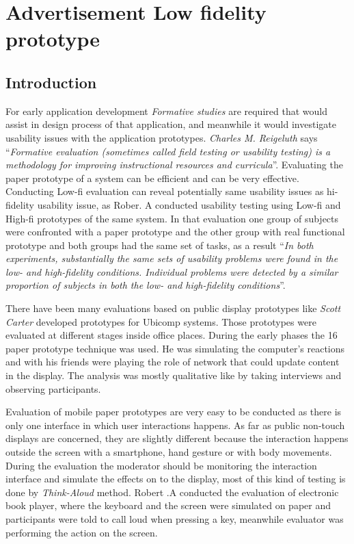\chapter{Advertisement Low fidelity prototype} %

\label{Chapter5} %
\newpage


\section{Introduction}
For early application development \emph{Formative studies} are required that would assist in design process of that application, and meanwhile it would investigate usability issues with the application prototypes. \emph{Charles M. Reigeluth} \cite{formativestudy} says ``\emph{Formative evaluation (sometimes called field testing or usability testing) is a methodology for improving instructional resources and curricula}''. Evaluating the paper prototype of a system can be efficient \cite{lowfidelityefficient} and can be very effective. Conducting Low-fi evaluation can reveal potentially same usability issues as hi-fidelity usability issue, as Rober. A \cite{usabilityproblems} conducted usability testing using Low-fi and High-fi prototypes of the same system. In that evaluation one group of subjects were confronted with a paper prototype and the other group with real functional prototype and both groups had the same set of tasks, as a result ``\emph{In both experiments, substantially the same sets of usability problems were found in the low- and high-fidelity conditions. Individual problems were detected by a similar proportion of subjects in both the low- and high-fidelity conditions}''. 

There have been many evaluations based on public display prototypes like \emph{Scott Carter} \cite{prototypetesting1} developed prototypes for Ubicomp systems. Those prototypes were evaluated at different stages inside office places. During the early phases the 16 paper prototype technique was used. He was simulating the computer’s reactions and with his friends were playing the role of network that could update content in the display. The analysis was mostly qualitative like by taking interviews and observing participants. 

Evaluation of mobile paper prototypes are very easy to be conducted as there is only one interface in which user interactions happens. As far as public non-touch displays are concerned, they are slightly different because the interaction happens outside the screen with a smartphone, hand gesture or with body movements. During the evaluation the moderator should be monitoring the interaction interface and simulate the effects on to the display, most of this kind of testing is done by \emph{Think-Aloud} method. Robert .A \cite{usabilityproblems} conducted the evaluation of electronic book player, where the keyboard and the screen were simulated on paper and participants were told to call loud when pressing a key, meanwhile evaluator was performing the action on the screen.

